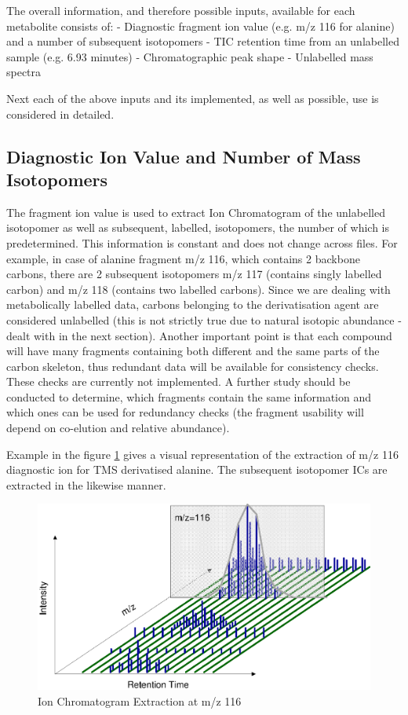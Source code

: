 \noindent

The overall information, and therefore possible inputs, available for each metabolite consists of:
- Diagnostic fragment ion value (e.g. m/z 116 for alanine) and a number of subsequent isotopomers
- TIC retention time from an unlabelled sample (e.g. 6.93 minutes)
- Chromatographic peak shape
- Unlabelled mass spectra

Next each of the above inputs and its implemented, as well as possible, use is considered in detailed.

\subsection
{Diagnostic Ion Value and Number of Mass Isotopomers}
The fragment ion value is used to extract Ion Chromatogram of the unlabelled 
isotopomer as well as subsequent, labelled, isotopomers, the number of which is 
predetermined. This information is constant and does not change across files. 
For example, in case of alanine fragment m/z 116, which contains 2 backbone 
carbons, there are 2 subsequent isotopomers m/z 117 (contains singly labelled 
carbon) and m/z 118 (contains two labelled carbons). Since we are dealing with 
metabolically labelled data, carbons belonging to the derivatisation agent are 
considered unlabelled (this is not strictly true due to natural isotopic 
abundance - dealt with in the next section).  Another important point is that 
each compound will have many fragments containing both different and the same 
parts of the carbon skeleton, thus redundant data will be available for 
consistency checks. These checks are currently not implemented. A further study 
should be conducted to determine, which fragments contain the same information 
and which ones can be used for redundancy checks (the fragment usability will 
depend on co-elution and relative abundance).

Example in the figure \ref{fig:82} gives a visual representation of the 
extraction of m/z 116 diagnostic ion for TMS derivatised alanine. The 
subsequent isotopomer ICs are extracted in the likewise manner.

\begin{figure}
  \begin{center}
    \includegraphics[scale=1]{graphics/chapter08/82.eps}
  \end{center}
  \caption{Ion Chromatogram Extraction at m/z 116}
  \label{fig:82}
\end{figure}

